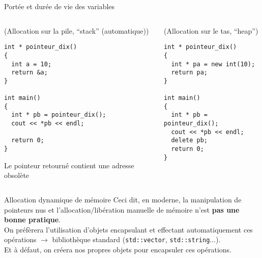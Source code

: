 \documentclass[c]{beamer}
\newcommand{\inline}[1]{\texttt{#1}}
\begin{document}
\begin{frame}[fragile]{Portée et durée de vie des variables}
 \begin{columns}
\begin{column}{0.7\columnwidth}
\begin{cbox}[][lwuc][\footnotesize](Allocation sur la pile, “stack” (automatique))
\begin{verbatim}
int * pointeur_dix()
{
  int a = 10;
  return &a;
}

int main()
{
  int * pb = pointeur_dix();
  cout << *pb << endl;

  return 0;
}
\end{verbatim}

\begin{cbox}[5][lrtuc][\centering][3.5][7]
Le pointeur retourné contient une adresse obsolète
\end{cbox}

\pause
\end{cbox}
\end{column}

\begin{column}{0.6\columnwidth}
\begin{cbox}[][lwuc][\footnotesize](Allocation sur le tas, “heap”)
\begin{verbatim}
int * pointeur_dix()
{
  int * pa = new int(10);
  return pa;
}

int main()
{
  int * pb = pointeur_dix();
  cout << *pb << endl;
  delete pb;
  return 0;
}
\end{verbatim}
\end{cbox}
\end{column}
\end{columns}
\end{frame}


\begin{frame}[fragile]{Allocation dynamique de mémoire}
Ceci dit, en \Cpp moderne, la manipulation de pointeurs nus et l'allocation/libération manuelle de mémoire n'est \textbf{pas une bonne pratique}.\\

On préfèrera l'utilisation d'objets encapsulant et effectant automatiquement ces opérations $\rightarrow$ bibliothèque standard (\inline{std::vector}, \inline{std::string}...).\\

Et à défaut, on créera nos propres objets pour encapsuler ces opérations. 
\end{frame}
\end{document}
